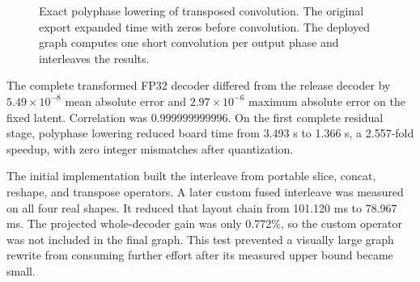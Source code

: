 \documentclass[10pt]{article}
\begin{document}
\begin{figure}[t]
\centering
{}
\caption{Exact polyphase lowering of transposed convolution. The original
export expanded time with zeros before convolution. The deployed graph
computes one short convolution per output phase and interleaves the results.}
\label{fig:polyphase}
\end{figure}

The complete transformed FP32 decoder differed from the release decoder by
$5.49\times10^{-8}$ mean absolute error and $2.97\times10^{-6}$ maximum
absolute error on the fixed latent. Correlation was
$0.999999999996$. On the first complete residual stage, polyphase lowering
reduced board time from 3.493 s to 1.366 s, a 2.557-fold speedup, with zero
integer mismatches after quantization.

The initial implementation built the interleave from portable slice, concat,
reshape, and transpose operators. A later custom fused interleave was measured
on all four real shapes. It reduced that layout chain from 101.120 ms to
78.967 ms. The projected whole-decoder gain was only 0.772\%, so the custom
operator was not included in the final graph. This test prevented a visually
large graph rewrite from consuming further effort after its measured upper
bound became small.
\end{document}
